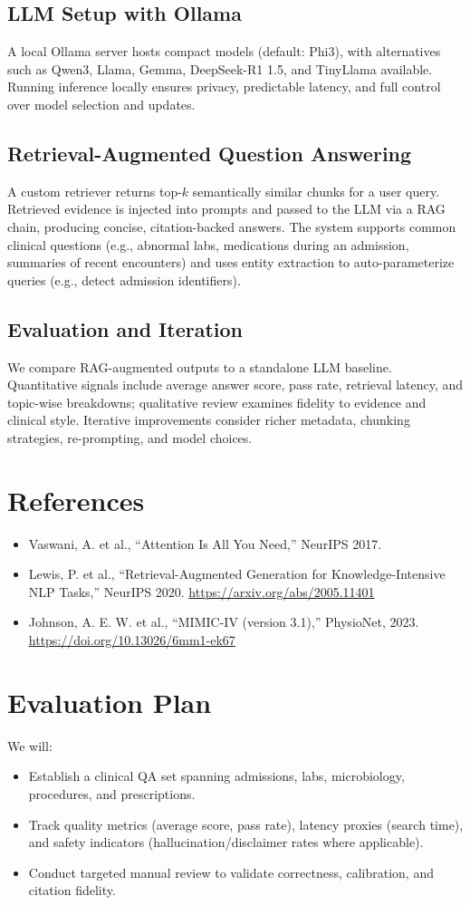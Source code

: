 \subsection{LLM Setup with Ollama}
A local Ollama server hosts compact models (default: Phi3), with alternatives such as Qwen3, Llama, Gemma, DeepSeek-R1 1.5, and TinyLlama available. Running inference locally ensures privacy, predictable latency, and full control over model selection and updates.

\subsection{Retrieval-Augmented Question Answering}
A custom retriever returns top-$k$ semantically similar chunks for a user query. Retrieved evidence is injected into prompts and passed to the LLM via a RAG chain, producing concise, citation-backed answers. The system supports common clinical questions (e.g., abnormal labs, medications during an admission, summaries of recent encounters) and uses entity extraction to auto-parameterize queries (e.g., detect admission identifiers).

\subsection{Evaluation and Iteration}
We compare RAG-augmented outputs to a standalone LLM baseline. Quantitative signals include average answer score, pass rate, retrieval latency, and topic-wise breakdowns; qualitative review examines fidelity to evidence and clinical style. Iterative improvements consider richer metadata, chunking strategies, re-prompting, and model choices.

\section{References}
\begin{itemize}
  \item Vaswani, A. et al., ``Attention Is All You Need,'' NeurIPS 2017.
  \item Lewis, P. et al., ``Retrieval-Augmented Generation for Knowledge-Intensive NLP Tasks,'' NeurIPS 2020. \url{https://arxiv.org/abs/2005.11401}
  \item Johnson, A. E. W. et al., ``MIMIC-IV (version 3.1),'' PhysioNet, 2023. \url{https://doi.org/10.13026/6mm1-ek67}
\end{itemize}

\section{Evaluation Plan}
We will:
\begin{itemize}
  \item Establish a clinical QA set spanning admissions, labs, microbiology, procedures, and prescriptions.
  \item Track quality metrics (average score, pass rate), latency proxies (search time), and safety indicators (hallucination/disclaimer rates where applicable).
  \item Conduct targeted manual review to validate correctness, calibration, and citation fidelity.
\end{itemize}

